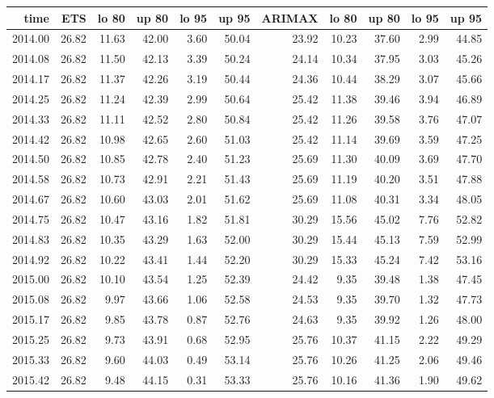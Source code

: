 \documentclass[10pt,a4paper]{article}\usepackage[]{graphicx}\usepackage[]{color}
\begin{document}
\begin{table}[ht]
\centering
\begin{tabular}{rrrrrrrrrrr}
  \hline
time & ETS  & lo 80 & up 80 & lo 95 & up 95 & ARIMAX  & lo 80 & up 80 & lo 95 & up 95 \\ 
  \hline
2014.00 & 26.82 & 11.63 & 42.00 & 3.60 & 50.04 & 23.92 & 10.23 & 37.60 & 2.99 & 44.85 \\ 
  2014.08 & 26.82 & 11.50 & 42.13 & 3.39 & 50.24 & 24.14 & 10.34 & 37.95 & 3.03 & 45.26 \\ 
  2014.17 & 26.82 & 11.37 & 42.26 & 3.19 & 50.44 & 24.36 & 10.44 & 38.29 & 3.07 & 45.66 \\ 
  2014.25 & 26.82 & 11.24 & 42.39 & 2.99 & 50.64 & 25.42 & 11.38 & 39.46 & 3.94 & 46.89 \\ 
  2014.33 & 26.82 & 11.11 & 42.52 & 2.80 & 50.84 & 25.42 & 11.26 & 39.58 & 3.76 & 47.07 \\ 
  2014.42 & 26.82 & 10.98 & 42.65 & 2.60 & 51.03 & 25.42 & 11.14 & 39.69 & 3.59 & 47.25 \\ 
  2014.50 & 26.82 & 10.85 & 42.78 & 2.40 & 51.23 & 25.69 & 11.30 & 40.09 & 3.69 & 47.70 \\ 
  2014.58 & 26.82 & 10.73 & 42.91 & 2.21 & 51.43 & 25.69 & 11.19 & 40.20 & 3.51 & 47.88 \\ 
  2014.67 & 26.82 & 10.60 & 43.03 & 2.01 & 51.62 & 25.69 & 11.08 & 40.31 & 3.34 & 48.05 \\ 
  2014.75 & 26.82 & 10.47 & 43.16 & 1.82 & 51.81 & 30.29 & 15.56 & 45.02 & 7.76 & 52.82 \\ 
  2014.83 & 26.82 & 10.35 & 43.29 & 1.63 & 52.00 & 30.29 & 15.44 & 45.13 & 7.59 & 52.99 \\ 
  2014.92 & 26.82 & 10.22 & 43.41 & 1.44 & 52.20 & 30.29 & 15.33 & 45.24 & 7.42 & 53.16 \\ 
  2015.00 & 26.82 & 10.10 & 43.54 & 1.25 & 52.39 & 24.42 & 9.35 & 39.48 & 1.38 & 47.45 \\ 
  2015.08 & 26.82 & 9.97 & 43.66 & 1.06 & 52.58 & 24.53 & 9.35 & 39.70 & 1.32 & 47.73 \\ 
  2015.17 & 26.82 & 9.85 & 43.78 & 0.87 & 52.76 & 24.63 & 9.35 & 39.92 & 1.26 & 48.00 \\ 
  2015.25 & 26.82 & 9.73 & 43.91 & 0.68 & 52.95 & 25.76 & 10.37 & 41.15 & 2.22 & 49.29 \\ 
  2015.33 & 26.82 & 9.60 & 44.03 & 0.49 & 53.14 & 25.76 & 10.26 & 41.25 & 2.06 & 49.46 \\ 
  2015.42 & 26.82 & 9.48 & 44.15 & 0.31 & 53.33 & 25.76 & 10.16 & 41.36 & 1.90 & 49.62 \\ 

\end{tabular}
\end{table}
\end{document}
